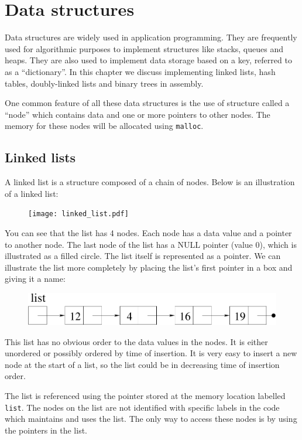 \documentclass[11pt,b5paper]{book}
\begin{document}
\chapter{Data structures}

Data structures are widely used in application programming.
They are frequently used for algorithmic purposes to implement structures like
stacks, queues and heaps.
They are also used to implement data storage based on a key, referred to as a ``dictionary''.
In this chapter we discuss implementing linked lists, hash tables,
doubly-linked lists and binary trees in assembly.

One common feature of all these data structures is the use of 
structure called a ``node'' which contains data and one or more pointers
to other nodes.
The memory for these nodes will be allocated using {\tt malloc}.

\section{Linked lists}

A linked list is a structure composed of a chain of nodes.
Below is an illustration of a linked list:

\begin{figure}[h!]
\centering\texttt{[image: linked\_list.pdf]}
\end{figure}

You can see that the list has 4 nodes.
Each node has a data value and a pointer to another node.
The last node of the list has a NULL pointer (value 0), which is
illustrated as a filled circle.
The list itself is represented as a pointer.
We can illustrate the list more completely by placing the list's first
pointer in a box and giving it a name:

\begin{figure}[h!]
\centering\includegraphics[width=4.5in]{linked_list_named.pdf}
\end{figure}

This list has no obvious order to the data values in the nodes.
It is either unordered or possibly ordered by time of insertion.
It is very easy to insert a new node at the start of a list, so
the list could be in decreasing time of insertion order.

The list is referenced using the pointer stored at the memory location
labelled {\tt list}.
The nodes on the list are not identified with specific labels in 
the code which maintains and uses the list.
The only way to access these nodes is by using the pointers
in the list.
\end{document}
